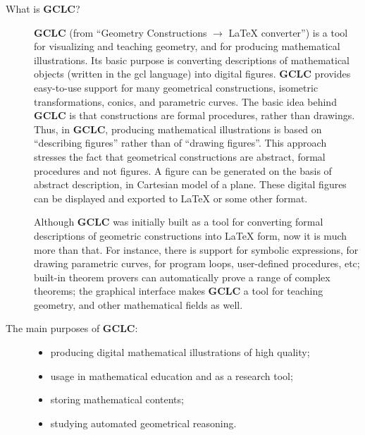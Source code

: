 \documentclass[a4paper]{book}
\newcommand{\gclc}{{\bfseries GCLC}\xspace}
\begin{document}
\begin{description}
\item[What is \gclc?]
\gclc{} (from ``Geometry Constructions $\rightarrow$ \LaTeX{} converter'')
is a tool for visualizing and teaching geometry, and for producing mathematical 
illustrations. Its basic purpose is converting descriptions of mathematical 
objects (written in the {\sc gcl} language) into digital figures. \gclc 
provides easy-to-use support for many geometrical constructions, isometric 
transformations, conics, and parametric curves. The basic idea behind \gclc 
is that constructions are formal procedures, rather than drawings.
Thus, in \gclc, producing mathematical illustrations is based on
``describing figures'' rather than of ``drawing figures''. This approach 
stresses the fact that geometrical constructions are abstract, formal 
procedures and not figures. A figure can be generated on the basis of 
abstract description, in Cartesian model of a plane. These digital figures 
can be displayed and exported to \LaTeX{} or some other format.

Although \gclc was initially built as a tool for converting formal
descriptions of geometric constructions into \LaTeX{} form, now it
is much more than that. For instance, there is support for symbolic
expressions, for drawing parametric curves, for program loops,
user-defined procedures, etc;
built-in theorem provers can automatically prove a range of
complex theorems; the graphical interface makes \gclc a tool for 
teaching geometry, and other mathematical fields as well.

\item[The main purposes of \gclc:] \hfill
\begin{itemize}
\item producing digital mathematical illustrations of high quality;
\item usage in mathematical education and as a research tool;
\item storing mathematical contents;
\item studying automated geometrical reasoning.
\end{itemize}


\end{description}
\end{document}
